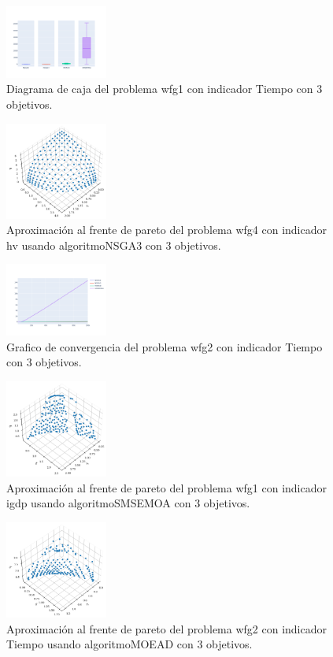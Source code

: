 \documentclass{article}
\begin{document}
\begin{figure}
	\includegraphics[width=0.3\textwidth]{wfg1_Tiempo_3_bp.png}
	\caption{Diagrama de caja del problema wfg1 con indicador Tiempo con 3 objetivos.}
\end{figure}
\begin{figure}
	\includegraphics[width=0.3\textwidth]{NSGA3_wfg4_hv_3_fp.png}
	\caption{Aproximación al frente de pareto del problema wfg4 con indicador hv usando algoritmoNSGA3 con 3 objetivos.}
\end{figure}
\clearpage
\begin{figure}
	\includegraphics[width=0.3\textwidth]{wfg2_Tiempo_3_gc.png}
	\caption{Grafico de convergencia del problema wfg2 con indicador Tiempo con 3 objetivos.}
\end{figure}
\begin{figure}
	\includegraphics[width=0.3\textwidth]{SMSEMOA_wfg1_igdp_3_fp.png}
	\caption{Aproximación al frente de pareto del problema wfg1 con indicador igdp usando algoritmoSMSEMOA con 3 objetivos.}
\end{figure}
\begin{figure}
	\includegraphics[width=0.3\textwidth]{MOEAD_wfg2_Tiempo_3_fp.png}
	\caption{Aproximación al frente de pareto del problema wfg2 con indicador Tiempo usando algoritmoMOEAD con 3 objetivos.}
\end{figure}
\end{document}
